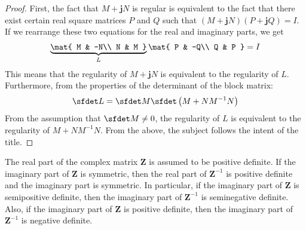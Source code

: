 \documentclass[graybox, envcountchap]{svmult}
\begin{document}
\begin{proof}
First, the fact that $M+ \bm{j} N$ is regular is equivalent to the fact that there exist certain real square matrices $P$ and $Q$ such that $(M+ \bm{j} N)(P+ \bm{j} Q)=I$.
If we rearrange these two equations for the real and imaginary parts, we get
\begin{align}\label{eq:MNinv}
\underbrace{
\mat{
M & -N\\
N & M
}
}_{L}
\mat{
P & -Q\\
Q & P
}
=I
\end{align}
This means that the regularity of $M+ \bm{j} N$ is equivalent to the regularity of $L$.
Furthermore, from the properties of the determinant of the block matrix:
\begin{align*}
\sfdet L =\sfdet M \sfdet \left(M+NM^{-1}N\right)
\end{align*}
From the assumption that $\sfdet M \neq 0$, the regularity of $L$ is equivalent to the regularity of $M+NM^{-1}N$.
From the above, the subject follows the intent of the title.
\end{proof}

 \begin{lemma}\label{lem:sdreim}
The real part of the complex matrix $\bm{Z}$ is assumed to be positive definite.
If the imaginary part of $\bm{Z}$ is symmetric, then the real part of $\bm{Z}^{-1}$ is positive definite and the imaginary part is symmetric.
In particular, if the imaginary part of $\bm{Z}$ is semipositive definite, then the imaginary part of $\bm{Z}^{-1}$ is seminegative definite.
Also, if the imaginary part of $\bm{Z}$ is positive definite, then the imaginary part of $\bm{Z}^{-1}$ is negative definite.
 \end{lemma}
\end{document}
